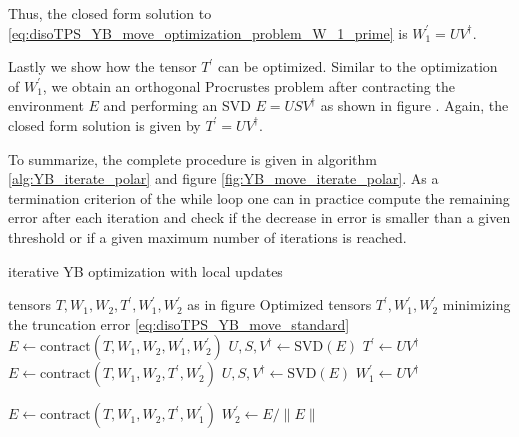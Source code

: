 Thus, the closed form solution to \eqref{eq:disoTPS_YB_move_optimization_problem_W_1_prime} is $W_1^\prime = UV^\dagger$. \par
Lastly we show how the tensor $T^\prime$ can be optimized. Similar to the optimization of $W_1^\prime$, we obtain an orthogonal Procrustes problem after contracting the environment $E$ and performing an SVD $E = USV^\dagger$ as shown in figure . Again, the closed form solution is given by $T^\prime = UV^\dagger$. \par
To summarize, the complete procedure is given in algorithm \ref{alg:YB_iterate_polar} and figure \ref{fig:YB_move_iterate_polar}. As a termination criterion of the while loop one can in practice compute the remaining error after each iteration and check if the decrease in error is smaller than a given threshold or if a given maximum number of iterations is reached.
\begin{algorithm}
	\caption{iterative YB optimization with local updates}
	\label{alg:YB_iterate_polar}
	\begin{algorithmic}
		\Require tensors $T, W_1, W_2, T^\prime, W_1^\prime, W_2^\prime$ as in figure 
		\Ensure Optimized tensors $T^\prime, W_1^\prime, W_2^\prime$ minimizing the truncation error \eqref{eq:disoTPS_YB_move_standard}
		\State $E \gets \text{contract}\left(T, W_1, W_2, W_1^\prime, W_2^\prime\right)$
		\State $U, S, V^\dagger \gets \text{SVD}\left(E\right)$
		\State $T^\prime \gets UV^\dagger$
		\State $E \gets \text{contract}\left(T, W_1, W_2, T^\prime, W_2^\prime\right)$
		\State $U, S, V^\dagger \gets \text{SVD}\left(E\right)$
		\State $W_1^\prime \gets UV^\dagger$
		
		\State $E \gets \text{contract}\left(T, W_1, W_2, T^\prime, W_1^\prime\right)$
		\State $W_2^\prime \gets E/\lVert E\rVert$
		\EndWhile
	\end{algorithmic}
\end{algorithm}
